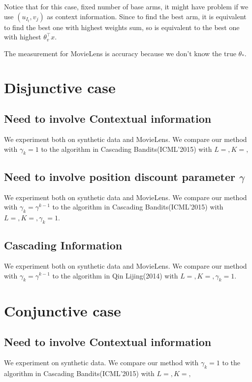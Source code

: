 \documentclass[a4paper,11pt]{article}
\begin{document}
Notice that for this case, fixed number of base arms, it might have problem if we use $(u_{I_t}, v_j)$ as context information.
Since to find the best arm, it is equivalent to find the best one with highest weights sum, so is equivalent to the best one with highest $\theta_{v}^{\top}x$.

The measurement for MovieLens is accuracy because we don't know the true $\theta_{\ast}$.

\section{Disjunctive case}

\subsection{Need to involve Contextual information}

We experiment both on synthetic data and MovieLens. We compare our method with $\gamma_k = 1$ to the algorithm in Cascading Bandits(ICML'2015) with $L= , K= ,$

\subsection{Need to involve position discount parameter $\gamma$}

We experiment both on synthetic data and MovieLens. We compare our method with $\gamma_k = \gamma^{k-1}$ to the algorithm in Cascading Bandits(ICML'2015) with $L= , K= , \gamma_k=1$.

\subsection{Cascading Information}

We experiment both on synthetic data and MovieLens. We compare our method with $\gamma_k = \gamma^{k-1}$ to the algorithm in Qin Lijing(2014) with $L= , K= , \gamma_k=1$.


\section{Conjunctive case}

\subsection{Need to involve Contextual information}

We experiment on synthetic data. We compare our method with $\gamma_k = 1$ to the algorithm in Cascading Bandits(ICML'2015) with $L= , K= ,$
\end{document}
